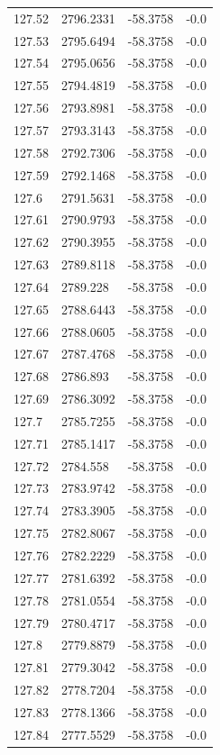 \begin{table}[H]
\begin{tabular}{llll}
127.52 & 2796.2331 & -58.3758 & -0.0 \\
127.53 & 2795.6494 & -58.3758 & -0.0 \\
127.54 & 2795.0656 & -58.3758 & -0.0 \\
127.55 & 2794.4819 & -58.3758 & -0.0 \\
127.56 & 2793.8981 & -58.3758 & -0.0 \\
127.57 & 2793.3143 & -58.3758 & -0.0 \\
127.58 & 2792.7306 & -58.3758 & -0.0 \\
127.59 & 2792.1468 & -58.3758 & -0.0 \\
127.6 & 2791.5631 & -58.3758 & -0.0 \\
127.61 & 2790.9793 & -58.3758 & -0.0 \\
127.62 & 2790.3955 & -58.3758 & -0.0 \\
127.63 & 2789.8118 & -58.3758 & -0.0 \\
127.64 & 2789.228 & -58.3758 & -0.0 \\
127.65 & 2788.6443 & -58.3758 & -0.0 \\
127.66 & 2788.0605 & -58.3758 & -0.0 \\
127.67 & 2787.4768 & -58.3758 & -0.0 \\
127.68 & 2786.893 & -58.3758 & -0.0 \\
127.69 & 2786.3092 & -58.3758 & -0.0 \\
127.7 & 2785.7255 & -58.3758 & -0.0 \\
127.71 & 2785.1417 & -58.3758 & -0.0 \\
127.72 & 2784.558 & -58.3758 & -0.0 \\
127.73 & 2783.9742 & -58.3758 & -0.0 \\
127.74 & 2783.3905 & -58.3758 & -0.0 \\
127.75 & 2782.8067 & -58.3758 & -0.0 \\
127.76 & 2782.2229 & -58.3758 & -0.0 \\
127.77 & 2781.6392 & -58.3758 & -0.0 \\
127.78 & 2781.0554 & -58.3758 & -0.0 \\
127.79 & 2780.4717 & -58.3758 & -0.0 \\
127.8 & 2779.8879 & -58.3758 & -0.0 \\
127.81 & 2779.3042 & -58.3758 & -0.0 \\
127.82 & 2778.7204 & -58.3758 & -0.0 \\
127.83 & 2778.1366 & -58.3758 & -0.0 \\
127.84 & 2777.5529 & -58.3758 & -0.0 \\

\end{tabular}
\end{table}
